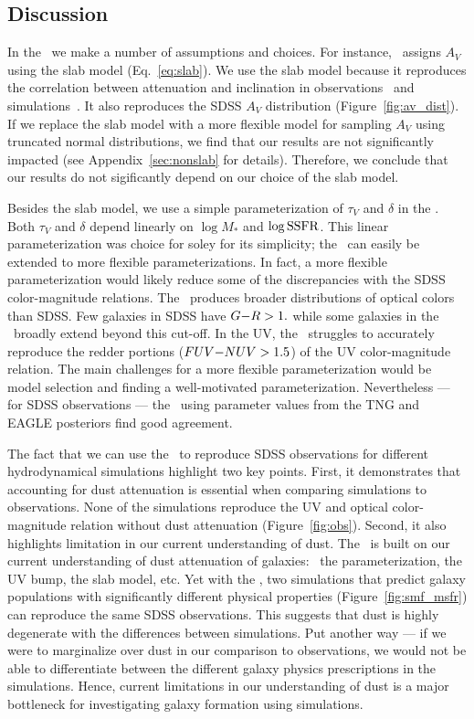 \subsection{Discussion}  
In the \eda~we make a number of assumptions and choices. For instance, 
\eda~assigns $A_V$ using the slab model (Eq.~\ref{eq:slab}). We use the slab
model because it reproduces the correlation between attenuation and inclination 
in observations~\citep{conroy2010b, wild2011, battisti2017, salim2020} and
simulations~\citep[\eg][]{chevallard2013, narayanan2018, trayford2020}.
It also reproduces the SDSS $A_V$ distribution (Figure~\ref{fig:av_dist}). If
we replace the slab model with a more flexible model for sampling $A_V$ using
truncated normal distributions, we find that our results are not significantly
impacted (see Appendix~\ref{sec:nonslab} for details). Therefore, we conclude
that our results do not sigificantly depend on our choice of the slab model. 

Besides the slab model, we use a simple parameterization of $\tau_V$ and
$\delta$ in the \eda. Both $\tau_V$ and $\delta$ depend linearly on $\log M_*$ 
and $\log {\rm SSFR}$. This linear parameterization was choice for soley for
its simplicity; the \eda~can easily be extended to more flexible
parameterizations. In fact, a more flexible parameterization would likely reduce 
some of the discrepancies with the SDSS color-magnitude relations. The
\eda~produces broader distributions of optical colors than SDSS. Few galaxies
in SDSS have $G{-}R > 1.$ while some galaxies in the \eda~broadly extend beyond
this cut-off. In the UV, the \eda~struggles to accurately reproduce the redder
portions ($FUV{-}NUV > 1.5$) of the UV color-magnitude relation. The main
challenges for a more flexible parameterization would be model selection and
finding a well-motivated parameterization. Nevertheless --- for SDSS 
observations --- the \eda~using parameter values from the TNG and EAGLE
posteriors find good agreement.

The fact that we can use the \eda~to reproduce SDSS observations for different
hydrodynamical simulations highlight two key points. First, it demonstrates 
that accounting for dust attenuation is essential when comparing simulations to
observations. None of the simulations reproduce the UV and optical
color-magnitude relation without dust attenuation (Figure~\ref{fig:obs}). 
Second, it also highlights limitation in our current understanding of dust. 
The \eda~is built on our current understanding of dust attenuation of galaxies:
\eg~the \citealt{noll2009} parameterization, the UV bump, the slab model, etc.
Yet with the \eda, two simulations that predict galaxy populations with
significantly different physical properties (Figure~\ref{fig:smf_msfr}) can
reproduce the same SDSS observations. This suggests that dust is highly
degenerate with the differences between simulations. Put another way --- if we 
were to marginalize over dust in our comparison to observations, we would not
be able to differentiate between the different galaxy physics prescriptions in
the simulations. Hence, current limitations in our understanding of dust is 
a major bottleneck for investigating galaxy formation using simulations.


